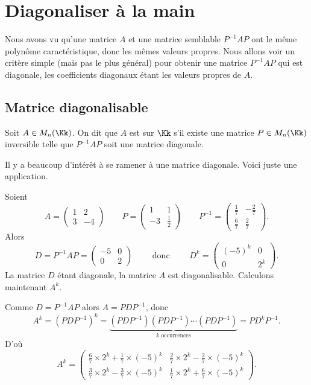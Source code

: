 \documentclass[11pt, class=report,crop=false]{standalone}
\begin{document}
\section{Diagonaliser à la main}

Nous avons vu qu'une matrice $A$ et une matrice semblable $P^{-1}AP$ ont le même polynôme caractéristique, donc les mêmes valeurs propres. Nous allons voir un critère simple (mais pas le plus général) pour obtenir une matrice $P^{-1}AP$ qui est diagonale, les coefficients diagonaux étant les valeurs propres de $A$.

\subsection{Matrice diagonalisable}


\begin{definition}
Soit $A \in M_n(\Kk)$. On dit que $A$ est  
sur $\Kk$ s'il existe une matrice $P \in M_n(\Kk)$ inversible telle que 
$P^{-1}AP$ soit une matrice diagonale.
\end{definition} 


Il y a beaucoup d'intérêt à se ramener à une matrice diagonale. Voici juste une application.

\begin{exemple}
Soient 
$$A = \begin{pmatrix}
1 & 2 \\
3 & -4
\end{pmatrix}\qquad
P = \begin{pmatrix}
1 & 1 \\
-3 & \frac{1}{2}
\end{pmatrix}\qquad
P^{-1}=\begin{pmatrix}
\frac{1}{7} & -\frac{2}{7} \\
\frac{6}{7} & \frac{2}{7}
\end{pmatrix}.$$
Alors 
$$D = P^{-1}AP =
\begin{pmatrix}
-5 & 0 \\
0 & 2
\end{pmatrix}
\qquad \text{ donc } \qquad
D^k=\begin{pmatrix}
(-5)^k & 0 \\
0 & 2^k
\end{pmatrix}.
$$
La matrice $D$ étant diagonale, la matrice $A$ est diagonalisable.
Calculons maintenant $A^k$.

Comme $D = P^{-1}AP$ alors $A = PDP^{-1}$, donc
$$A^k = (PDP^{-1})^k = \underbrace{(PDP^{-1})(PDP^{-1}) \cdots (PDP^{-1})}_{k \text{ occurrences}} = P D^k P^{-1}.$$
D'où
$$A^k=
\begin{pmatrix}
\frac{6}{7} \times 2^{k} + \frac{1}{7} \times \left(-5\right)^{k} &
\frac{2}{7} \times 2^{k} - \frac{2}{7} \times \left(-5\right)^{k} \\
\frac{3}{7} \times 2^{k} - \frac{3}{7} \times \left(-5\right)^{k} &
\frac{1}{7} \times 2^{k} + \frac{6}{7} \times \left(-5\right)^{k}
\end{pmatrix}.
$$
\end{exemple}
\end{document}
